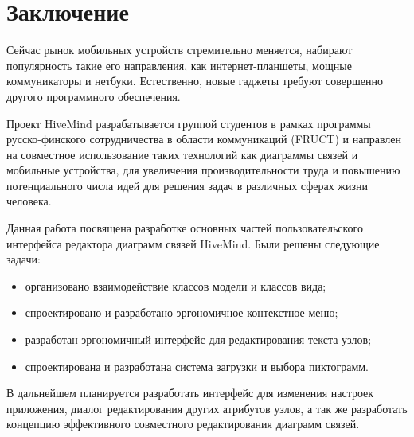 \newpage

\chapter*{Заключение} 


Сейчас рынок мобильных устройств стремительно меняется, набирают популярность такие его направления, как интернет-планшеты, мощные коммуникаторы и нетбуки. Естественно, новые гаджеты требуют совершенно другого программного обеспечения.

Проект HiveMind разрабатывается группой студентов в рамках программы русско-финского сотрудничества в области коммуникаций (FRUCT) и направлен на совместное использование таких технологий как диаграммы связей и мобильные устройства, для увеличения производительности труда и повышению потенциального числа идей для решения задач в различных сферах жизни человека.

Данная работа посвящена разработке основных частей пользовательского интерфейса редактора диаграмм связей HiveMind.
Были решены следующие задачи:
\begin{itemize}
\item
организовано взаимодействие классов модели и классов вида;
\item спроектировано и разработано эргономичное контекстное меню;
\item разработан эргономичный интерфейс для редактирования текста узлов;
\item спроектирована и разработана система загрузки и выбора пиктограмм.
\end{itemize}

В дальнейшем планируется разработать интерфейс для изменения настроек приложения, диалог редактирования других атрибутов узлов, а так же разработать концепцию эффективного совместного редактирования диаграмм связей.
